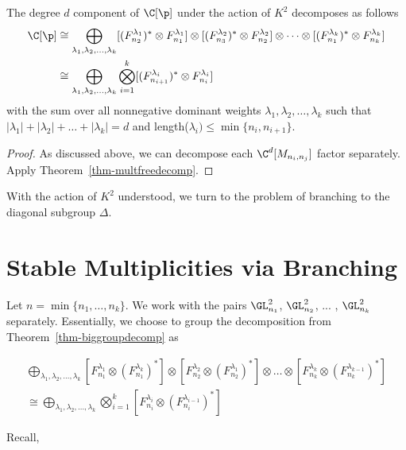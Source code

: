     \begin{thm} \label{thm-biggroupdecomp}
        The degree $d$ component of $\C[\p]$ under the action of $K^2$ decomposes as follows 
        \begin{align*}
        \C[\p] &\cong \bigoplus_{\lambda_1, \lambda_2, \dots , \lambda_k} [(F_{n_2}^{\lambda_1})^*\otimes F_{n_1}^{\lambda_1}] \otimes [(F_{n_3}^{\lambda_2})^*\otimes F_{n_2}^{\lambda_2}] \otimes \dots \otimes [(F_{n_1}^{\lambda_k})^*\otimes F_{n_k}^{\lambda_k}]\\
        &\cong \bigoplus_{\lambda_1, \lambda_2, \dots , \lambda_k} \bigotimes_{i=1}^k [(F_{n_{i+1}}^{\lambda_i})^* \otimes F_{n_i}^{\lambda_i}]
        \end{align*}
        with the sum over all nonnegative dominant weights $\lambda_1, \lambda_2, \dots ,\lambda_k$ such that $|\lambda_1| + |\lambda_2| + \dots + |\lambda_k| = d$ and length($\lambda_i) \leq \min\{n_i,n_{i+1}\}$.
    \end{thm}

    \begin{proof}
        As discussed above, we can decompose each $\C^d[M_{n_i,n_j}]$ factor separately. Apply Theorem~\ref{thm-multfreedecomp}.
    \end{proof}


With the action of $K^2$ understood, we turn to the problem of branching to the diagonal subgroup $\Delta$. 


\section{Stable Multiplicities via Branching}


Let $n = \min \{n_1, \dots , n_k\}$. We work with the pairs $\GL_{n_1}^2$, $\GL_{n_2}^2$, ... , $\GL_{n_k}^2$ separately. Essentially, we choose to group the decomposition from Theorem~\ref{thm-biggroupdecomp} as

\begin{gather*}
\bigoplus_{\lambda_1, \lambda_2, \dots , \lambda_k} [F_{n_1}^{\lambda_1}\otimes (F_{n_1}^{\lambda_k})^*] \otimes [F_{n_2}^{\lambda_2}\otimes (F_{n_2}^{\lambda_1})^*] \otimes \dots \otimes [F_{n_k}^{\lambda_k}\otimes (F_{n_k}^{\lambda_{k-1}})^*] \\
\cong \bigoplus_{\lambda_1, \lambda_2, \dots , \lambda_k} \bigotimes_{i=1}^k [F_{n_i}^{\lambda_i}\otimes (F_{n_i}^{\lambda_{i-1}})^*]
\end{gather*}

Recall,


